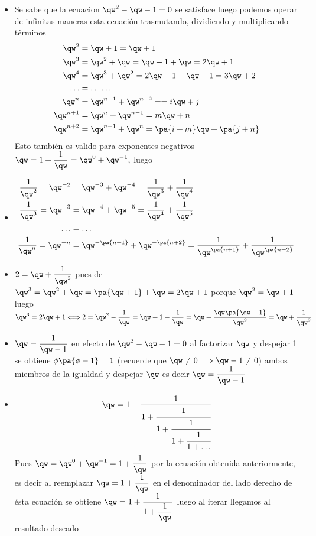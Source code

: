 \begin{itemize}
  \item  Se sabe que la ecuacion $\qw^2-\qw-1=0$ se satisface luego podemos operar de infinitas maneras  esta ecuación trasmutando, dividiendo y multiplicando términos \begin{align*}
    \qw^2&=\qw+1=\qw+1\\
    \qw^3&=\qw^2+\qw=\qw+1+\qw=2\qw+1\\
    \qw^4&=\qw^3+\qw^2=2\qw+1+\qw+1=3\qw+2\\
    \ldots &=\ldots\ldots\\
    \qw^n&=\qw^{n-1}+\qw^{n-2}==i\qw+j\\
    \qw^{n+1}&=\qw^{n}+\qw^{n-1}=m\qw+n\\
    \qw^{n+2}&=\qw^{n+1}+\qw^{n}=\pa{i+m}\qw+\pa{j+n}
  \end{align*}
   Esto también es valido para exponentes negativos $\qw=1+\dfrac{1}{\qw}=\qw^0+\qw^{-1},$  luego

  \item \begin{align*}
  \dfrac{1}{\qw^{2}}=\qw^{-2}&=\qw^{-3}+\qw^{-4}=\dfrac{1}{\qw^{3}}+\dfrac{1}{\qw^{4}}\\
  \dfrac{1}{\qw^{3}}=\qw^{-3}&=\qw^{-4}+\qw^{-5}=\dfrac{1}{\qw^{4}}+\dfrac{1}{\qw^{5}}\\
  \ldots&=\ldots\\
  \dfrac{1}{\qw^{n}}=\qw^{-n}&=\qw^{-\pa{n+1}}+\qw^{-\pa{n+2}}=\dfrac{1}{\qw^{\pa{n+1}}}+\dfrac{1}{\qw^{\pa{n+2}}}\\
\end{align*}

  \item $2=\qw+\dfrac{1}{\qw^2}$ pues de $\qw^{3}=\qw^{2}+\qw=\pa{\qw+1}+\qw=2\qw+1$ porque $\qw^{2}=\qw+1$ luego $\qw^{3}=2\qw+1\Longleftrightarrow 2=\qw^2-\dfrac{1}{\qw}=\qw+1-\dfrac{1}{\qw}=\qw+\dfrac{\qw\pa{\qw-1}}{\qw^2}=\qw+\dfrac{1}{\qw^2}$

  \item $\qw=\dfrac{1}{\qw-1}$ en efecto de $\qw^2-\qw-1=0$ al factorizar $\qw$ y despejar 1 se obtiene $\phi\pa{\phi-1}=1$ (recuerde que $\qw\neq 0\Longrightarrow \qw-1\neq 0$) ambos miembros de la igualdad y despejar $\qw$ es decir $\qw=\dfrac{1}{\qw-1}$


  \item $$\qw=1+\cfrac{1}{1+\cfrac{1}{1+\cfrac{1}{1+\cfrac{1}{1+\ldots}}}}$$
Pues $\qw={\qw}^0+{\qw}^{-1}=1+\dfrac{1}{\qw}$ por la ecuación obtenida anteriormente, es decir al reemplazar $\qw=1+\dfrac{1}{\qw}$ en el denominador del lado derecho de ésta ecuación se obtiene $\qw=1+\dfrac{1}{1+\dfrac{1}{\qw}}$ luego al iterar llegamos al resultado deseado
\end{itemize}

















